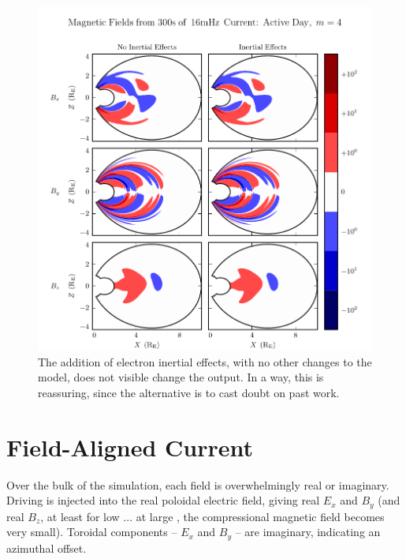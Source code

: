 \begin{figure}[H]
    \centering
    \includegraphics[width=\textwidth]{figures/B_1_004_016mHz.pdf}
    \caption[Magnetic Field Comparison With and Without Electron Inertial Effects]{
      The addition of electron inertial effects, with no other changes to the model, does not visible change the output. In a way, this is reassuring, since the alternative is to cast doubt on past work. 
    }
    \label{fig_B_1_004_016mHz}
\end{figure}

\section{Field-Aligned Current}
  \label{sec_fac}

Over the bulk of the simulation, each field is overwhelmingly real or imaginary. Driving is injected into the real poloidal electric field, giving real $E_x$ and $B_y$ (and real $B_z$, at least for low \azm... at large \azm, the compressional magnetic field becomes very small). Toroidal components -- $E_x$ and $B_y$ -- are imaginary, indicating an azimuthal offset. 


